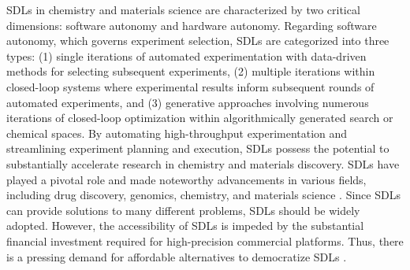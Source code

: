 SDLs in chemistry and materials science are characterized by two critical dimensions: software autonomy and hardware autonomy. Regarding software autonomy, which governs experiment selection, SDLs are categorized into three types: (1) single iterations of automated experimentation with data-driven methods for selecting subsequent experiments, (2) multiple iterations within closed-loop systems where experimental results inform subsequent rounds of automated experiments, and (3) generative approaches involving numerous iterations of closed-loop optimization within algorithmically generated search or chemical spaces. By automating high-throughput experimentation and streamlining experiment planning and execution, SDLs possess the potential to substantially accelerate research in chemistry and materials discovery. SDLs have played a pivotal role and made noteworthy advancements in various fields, including drug discovery, genomics, chemistry, and materials science \cite{Tom2024}. Since SDLs can provide solutions to many different problems, SDLs should be widely adopted. However, the accessibility of SDLs is impeded by the substantial financial investment required for high-precision commercial platforms. Thus, there is a pressing demand for affordable alternatives to democratize SDLs \cite{Lo2024}.